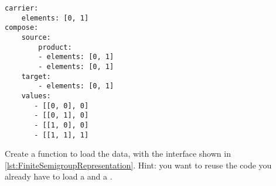 \begin{longcode}
  \begin{verbatim}
carrier:
    elements: [0, 1]
compose:
    source:
        product:
        - elements: [0, 1]
        - elements: [0, 1]
    target:
        - elements: [0, 1]
    values:
       - [[0, 0], 0]
       - [[0, 1], 0]
       - [[1, 0], 0]
       - [[1, 1], 1]
  \end{verbatim}
  \caption{}
  \label{lst:sm_min3}
\end{longcode}



\begin{codeexercise}
  \label{ex:TestFiniteSemigroupRepresentation}
  Create a function to load the data, with the interface shown in \cref{lst:FiniteSemigroupRepresentation}.
  Hint: you want to reuse the code you already have to load a \FiniteSet
  and a \FiniteMap.
\end{codeexercise}



